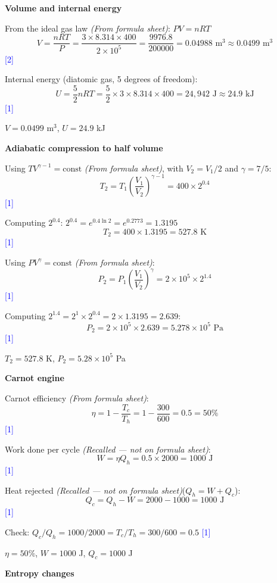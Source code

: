 \documentclass[12pt,a4paper]{article}
\newcommand{\markstep}[1]{\hfill\textcolor{blue}{[#1]}}
\newcommand{\finalanswer}[1]{%
  \begin{tcolorbox}[colback=green!5!white,colframe=green!50!black,boxrule=0.5pt]
  #1
  \end{tcolorbox}
}
\newcommand{\fromsheet}{\textit{(From formula sheet)}}
\newcommand{\recalled}{\textit{(Recalled --- not on formula sheet)}}
\begin{document}
\begin{parts}
\item \textbf{Volume and internal energy} 

From the ideal gas law \fromsheet: $PV = nRT$
\[
V = \frac{nRT}{P} = \frac{3 \times 8.314 \times 400}{2 \times 10^5} = \frac{9976.8}{200000} = 0.04988 \text{ m}^3 \approx 0.0499 \text{ m}^3
\]
\markstep{2}

Internal energy (diatomic gas, 5 degrees of freedom):
\[
U = \frac{5}{2}nRT = \frac{5}{2} \times 3 \times 8.314 \times 400 = 24{,}942 \text{ J} \approx 24.9 \text{ kJ}
\]
\markstep{1}

\finalanswer{$V = 0.0499$ m$^3$, $U = 24.9$ kJ}

\item \textbf{Adiabatic compression to half volume} 

Using $TV^{\gamma-1} = \text{const}$ \fromsheet, with $V_2 = V_1/2$ and $\gamma = 7/5$:
\[
T_2 = T_1 \left(\frac{V_1}{V_2}\right)^{\gamma - 1} = 400 \times 2^{0.4}
\]
\markstep{1}

Computing $2^{0.4}$: $2^{0.4} = e^{0.4\ln 2} = e^{0.2773} = 1.3195$
\[
T_2 = 400 \times 1.3195 = 527.8 \text{ K}
\]
\markstep{1}

Using $PV^\gamma = \text{const}$ \fromsheet:
\[
P_2 = P_1\left(\frac{V_1}{V_2}\right)^\gamma = 2 \times 10^5 \times 2^{1.4}
\]
\markstep{1}

Computing $2^{1.4} = 2^1 \times 2^{0.4} = 2 \times 1.3195 = 2.639$:
\[
P_2 = 2 \times 10^5 \times 2.639 = 5.278 \times 10^5 \text{ Pa}
\]
\markstep{1}

\finalanswer{$T_2 = 527.8$ K, $P_2 = 5.28 \times 10^5$ Pa}

\item \textbf{Carnot engine} 

Carnot efficiency \fromsheet:
\[
\eta = 1 - \frac{T_c}{T_h} = 1 - \frac{300}{600} = 0.5 = 50\%
\]
\markstep{1}

Work done per cycle \recalled:
\[
W = \eta Q_h = 0.5 \times 2000 = 1000 \text{ J}
\]
\markstep{1}

Heat rejected \recalled ($Q_h = W + Q_c$):
\[
Q_c = Q_h - W = 2000 - 1000 = 1000 \text{ J}
\]
\markstep{1}

Check: $Q_c/Q_h = 1000/2000 = T_c/T_h = 300/600 = 0.5$ \checkmark \markstep{1}

\finalanswer{$\eta = 50\%$, $W = 1000$ J, $Q_c = 1000$ J}

\item \textbf{Entropy changes} 


\end{parts}
\end{document}
